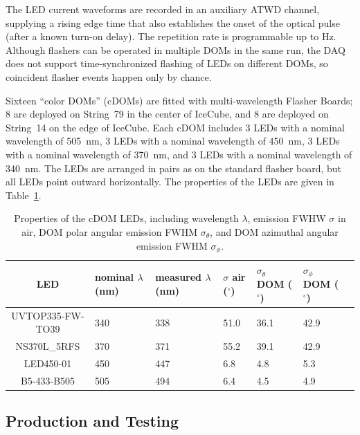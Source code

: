 The LED current waveforms are recorded in an auxiliary ATWD channel, supplying
a rising edge time that also establishes the onset of the optical pulse (after a known
turn-on delay).
The repetition rate is programmable up to \unit[610]{Hz}.
Although flashers can be
operated in multiple DOMs in the same run, the DAQ does not support
time-synchronized flashing of LEDs on different DOMs, so coincident flasher
events happen only by chance. 

Sixteen ``color DOMs'' (cDOMs) are fitted with multi-wavelength
Flasher Boards; 8 are deployed on String~79 in the center of IceCube, and 8
are deployed on String~14 on the edge of IceCube.  Each cDOM includes 3 LEDs with a nominal
wavelength of 505~nm, 3 LEDs with a nominal wavelength of 450~nm, 3
LEDs with a nominal wavelength of 370~nm, and 3 LEDs with a nominal
wavelength of 340~nm. The LEDs are arranged in pairs as on the
standard flasher board, but all LEDs point outward horizontally. 
The properties of the LEDs are given in
Table~\ref{table:cdom_properties}.

\begin{table}
\caption{Properties of the cDOM LEDs, including wavelength $\lambda$,
  emission FWHW $\sigma$ in air, DOM polar
  angular emission FWHM $\sigma_{\theta}$, and DOM azimuthal angular emission
  FWHM $\sigma_{\phi}$.}
\begin{tabularx}{\linewidth}{|c|X|X|X|X|X|X|}
  \hline
 LED& nominal $\lambda$ (nm) & measured $\lambda$ (nm) & $\sigma$ air ($^{\circ}$) &
 $\sigma_{\theta}$ DOM ($^{\circ}$) & $\sigma_{\phi}$ DOM ($^{\circ}$)\\
\hline
UVTOP335-FW-TO39 & 340 & 338 & 51.0 & 36.1 & 42.9 \\
\hline
NS370L\_5RFS & 370 & 371 & 55.2 & 39.1 & 42.9 \\
\hline
LED450-01 & 450 & 447 &	6.8 & 4.8 &	5.3 \\
\hline
B5-433-B505 & 505 & 494 & 6.4 &	4.5 & 4.9 \\
\hline
\end{tabularx}
\label{table:cdom_properties}
\end{table}

\subsection{\label{sec:dom_prodtest} Production and Testing}

